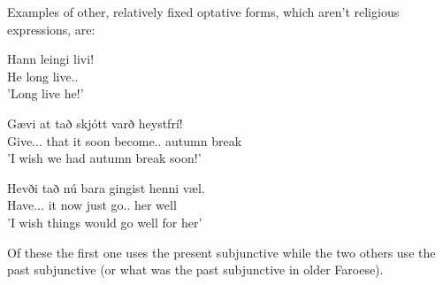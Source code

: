 \documentclass[12pt,%
]{lin-v2/lin}
\begin{document}
Examples of other, relatively fixed optative forms, which aren't religious expressions, are:
\begin{exe}
    \ex
    \begin{xlist}
        \item \gll Hann leingi livi!\\
        He long live.\Third\Sg.\Subj{}\\
        \trans 'Long live he!'
        \item \gll Gævi at tað skjótt varð heystfrí!\\
        Give.\Third\Sg.\Pst.\Subj{} that it soon become.\Sg.\Pst{} {autumn break}\\
        \trans 'I wish we had autumn break soon!'
        \item \gll Hevði tað nú bara gingist henni væl.\\
        Have.\Third\Sg.\Pst.\Subj{} it now just go.\Sg.\Pst{} her well\\
        \trans 'I wish things would go well for her'
    \end{xlist}
\end{exe}

Of these the first one uses the present subjunctive while the two others use the past subjunctive (or what was the
past subjunctive in older Faroese).
\end{document}
